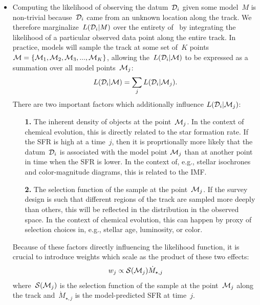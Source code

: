 \documentclass[ms.tex]{subfiles}
\begin{document}
\begin{itemize}
	\item Computing the likelihood of observing the datum~$\mathcal{D}_i$ given
	some model~$M$ is non-trivial because~$\mathcal{D}_i$ came from an unknown
	location along the track.
	We therefore marginalize~$L(\mathcal{D}_i | M)$ over the entirety
	of~ by integrating the likelihood of a particular observed data
	point along the entire track.
	In practice, models will sample the track at some set of~$K$ points
	$\mathcal{M} = \{\mathcal{M}_1, \mathcal{M}_2, \mathcal{M}_3, ... , 
	\mathcal{M}_K\}$, allowing the~$L(\mathcal{D}_i | \mathcal{M})$ to be
	expressed as a summation over all model points~$\mathcal{M}_j$:
	\begin{equation}
	\label{eq:l_di_m}
	L(\mathcal{D}_i | \mathcal{M}) = \sum_j L(\mathcal{D}_i | \mathcal{M}_j).
	\end{equation}
	There are two important factors which additionally influence
	$L(\mathcal{D}_i | \mathcal{M}_j)$:
	\begin{itemize}

		\item[\textbf{1.}] The inherent density of objects at the
		point~$\mathcal{M}_j$.
		In the context of chemical evolution, this is directly related to the
		star formation rate.
		If the SFR is high at a time~$j$, then it is proprtionally more likely
		that the datum~$\mathcal{D}_i$ is associated with the model point
		$\mathcal{M}_j$ than at another point in time when the SFR is lower.
		In the context of, e.g., stellar isochrones and color-magnitude
		diagrams, this is related to the IMF.

		\item[\textbf{2.}] The selection function of the sample at the
		point~$\mathcal{M}_j$.
		If the survey design is such that different regions of the track are
		sampled more deeply than others, this will be reflected in the
		distribution in the observed space.
		In the context of chemical evolution, this can happen by proxy of
		selection choices in, e.g., stellar age, luminosity, or color.

	\end{itemize}

	Because of these factors directly influencing the likelihood function, it
	is crucial to introduce weights which scale as the product of these two
	effects:
	\begin{equation}
	\label{eq:weights}
	w_j \propto \mathcal{S}(\mathcal{M}_j) \dot{M}_{\star,j}
	\end{equation}
	where~$\mathcal{S}(\mathcal{M}_j)$ is the selection function of the sample
	at the point~$\mathcal{M}_j$ along the track and~$\dot{M}_{\star,j}$ is the
	model-predicted SFR at time~$j$.


\end{itemize}
\end{document}
